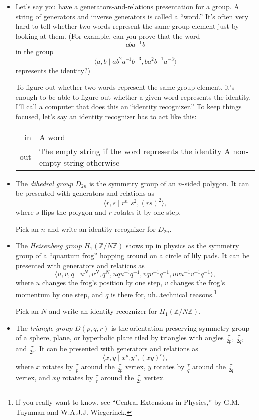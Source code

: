 \documentclass{article}
\newcommand*{\note}{\item[\Letter]}
\newcommand*{\writeit}{\item[\NibRight]}
\newcommand{\spec}[1]{{\sc #1}}
\begin{document}
\begin{itemize}
\note
Let's say you have a generators-and-relations presentation for a group. A string of generators and inverse generators is called a ``word.'' It's often very hard to tell whether two words represent the same group element just by looking at them. (For example, can you prove that the word
\[ aba^{-1}b \]
in the group
\[ \langle a, b \mid ab^2a^{-1}b^{-3}, ba^2b^{-1}a^{-3} \rangle \]
represents the identity?)

To figure out whether two words represent the same group element, it's enough to be able to figure out whether a given word represents the identity. I'll call a computer that does this an ``identity recognizer.'' To keep things focused, let's say an identity recognizer has to act like this:

\begin{tabularx}{\textwidth}{rX}
\spec{in} & A word \\
\spec{out} & The empty string if the word represents the identity \newline A non-empty string otherwise
\end{tabularx}
\writeit
The {\em dihedral group} $D_{2n}$ is the symmetry group of an $n$-sided polygon. It can be presented with generators and relations as
\[ \langle r, s \mid r^n, s^2, (rs)^2 \rangle, \]
where $s$ flips the polygon and $r$ rotates it by one step.

Pick an $n$ and write an identity recognizer for $D_{2n}$.
\writeit
The {\em Heisenberg group} $H_1(\mathbb{Z}/N\mathbb{Z})$ shows up in physics as the symmetry group of a ``quantum frog'' hopping around on a circle of lily pads. It can be presented with generators and relations as
\[ \langle u, v, q \mid u^N, v^N, q^N, uqu^{-1}q^{-1}, vqv^{-1}q^{-1}, uvu^{-1}v^{-1}q^{-1} \rangle, \]
where $u$ changes the frog's position by one step, $v$ changes the frog's momentum by one step, and $q$ is there for, uh\ldots technical reasons.\footnote{If you really want to know, see ``Central Extensions in Physics,'' by G.M. Tuynman and W.A.J.J. Wiegerinck.}

Pick an $N$ and write an identity recognizer for $H_1(\mathbb{Z}/N\mathbb{Z})$.
\writeit
The {\em triangle group} $D(p, q, r)$ is the orientation-preserving symmetry group of a sphere, plane, or hyperbolic plane tiled by triangles with angles $\frac{\tau}{2p}$, $\frac{\tau}{2q}$, and $\frac{\tau}{2r}$. It can be presented with generators and relations as
\[ \langle x, y \mid x^p, y^q, (xy)^r \rangle, \]
where $x$ rotates by $\frac{\tau}{p}$ around the $\frac{\tau}{2p}$ vertex, $y$ rotates by $\frac{\tau}{q}$ around the $\frac{\tau}{2q}$ vertex, and $xy$ rotates by $\frac{\tau}{r}$ around the $\frac{\tau}{2r}$ vertex.


\end{itemize}
\end{document}
